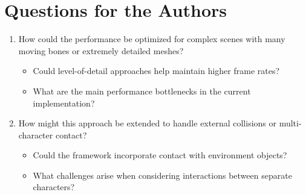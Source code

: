 \documentclass[12pt]{article}
\begin{document}
\section{Questions for the Authors}
\begin{enumerate}[noitemsep]
    \item How could the performance be optimized for complex scenes with many moving bones or extremely detailed meshes?
    \begin{itemize}[noitemsep]
        \item Could level-of-detail approaches help maintain higher frame rates?
        \item What are the main performance bottlenecks in the current implementation?
    \end{itemize}
    
    \item How might this approach be extended to handle external collisions or multi-character contact?
    \begin{itemize}[noitemsep]
        \item Could the framework incorporate contact with environment objects?
        \item What challenges arise when considering interactions between separate characters?
    \end{itemize}
\end{enumerate}
\end{document}
